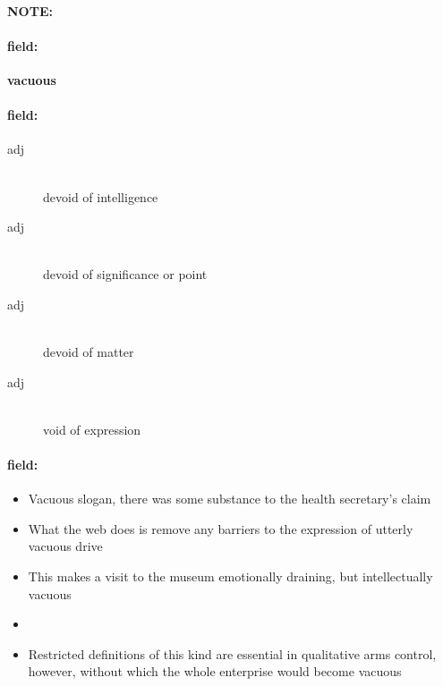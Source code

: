 \documentclass[12pt]{article}
\newenvironment{note}{\paragraph{NOTE:}}{}
\newenvironment{field}{\paragraph{field:}}{}
\begin{document}
\begin{note}
\begin{field}
\textbf{\large vacuous}
\end{field}


\begin{field}
\begin{description}
\item[adj] \hfill \\ 
devoid of intelligence

\item[adj] \hfill \\ 
devoid of significance or point

\item[adj] \hfill \\ 
devoid of matter

\item[adj] \hfill \\ 
void of expression

\end{description}
\end{field}

\begin{field}
\begin{itemize}
\item Vacuous slogan, there was some substance to the health secretary's claim
\item What the web does is remove any barriers to the expression of utterly vacuous drive
\item This makes a visit to the museum emotionally draining, but intellectually vacuous
\item  
\item Restricted definitions of this kind are essential in qualitative arms control, however, without which the whole enterprise would become vacuous
\end{itemize}
\end{field}
\end{note}
\end{document}
